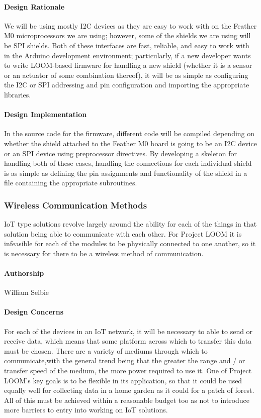 \documentclass[onecolumn, draftclsnofoot,10pt, compsoc]{IEEEtran}
\begin{document}
\paragraph{Design Rationale}
    We will be using mostly I2C devices as they are easy to work with on the Feather M0 microprocessors we are using; however, some of the shields we are using will be SPI shields. Both of these interfaces are fast, reliable, and easy to work with in the Arduino development environment; particularly, if a new developer wants to write LOOM-based firmware for handling a new shield (whether it is a sensor or an actuator of some combination thereof), it will be as simple as configuring the I2C or SPI addressing and pin configuration and importing the appropriate libraries.

\paragraph{Design Implementation}
    In the source code for the firmware, different code will be compiled depending on whether the shield attached to the Feather M0 board is going to be an I2C device or an SPI device using preprocessor directives. By developing a skeleton for handling both of these cases, handling the connections for each individual shield is as simple as defining the pin assignments and functionality of the shield in a file containing the appropriate subroutines.


\subsubsection{Wireless Communication Methods}
    IoT type solutions revolve largely around the ability for each of the things in that solution being able to communicate with each other. For Project LOOM it is infeasible for each of the modules to be physically connected to one another, so it is necessary for there to be a wireless method of communication. 

\paragraph{Authorship}
    William Selbie

\paragraph{Design Concerns}
    For each of the devices in an IoT network, it will be necessary to able to send or receive data, which means that some platform across which to transfer this data must be chosen. There are a variety of mediums through which to communicate,with the general trend being that the greater the range and / or transfer speed of the medium, the more power required to use it. One of Project LOOM's key goals is to be flexible in its application, so that it could be used equally well for collecting data in a home garden as it could for a patch of forest. All of this must be achieved within a reasonable budget too as not to introduce more barriers to entry into working on IoT solutions. 
\end{document}
